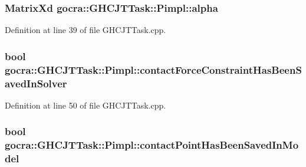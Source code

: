 \subsubsection[{\texorpdfstring{alpha}{alpha}}]{\setlength{\rightskip}{0pt plus 5cm}Matrix\+Xd gocra\+::\+G\+H\+C\+J\+T\+Task\+::\+Pimpl\+::alpha}\hypertarget{structgocra_1_1GHCJTTask_1_1Pimpl_a71d5221274d0ee84040992042d609cec}{}\label{structgocra_1_1GHCJTTask_1_1Pimpl_a71d5221274d0ee84040992042d609cec}


Definition at line 39 of file G\+H\+C\+J\+T\+Task.\+cpp.

\subsubsection[{\texorpdfstring{contact\+Force\+Constraint\+Has\+Been\+Saved\+In\+Solver}{contactForceConstraintHasBeenSavedInSolver}}]{\setlength{\rightskip}{0pt plus 5cm}bool gocra\+::\+G\+H\+C\+J\+T\+Task\+::\+Pimpl\+::contact\+Force\+Constraint\+Has\+Been\+Saved\+In\+Solver}\hypertarget{structgocra_1_1GHCJTTask_1_1Pimpl_a2cb3237a503679f5dcc201c05b00f248}{}\label{structgocra_1_1GHCJTTask_1_1Pimpl_a2cb3237a503679f5dcc201c05b00f248}


Definition at line 50 of file G\+H\+C\+J\+T\+Task.\+cpp.

\subsubsection[{\texorpdfstring{contact\+Point\+Has\+Been\+Saved\+In\+Model}{contactPointHasBeenSavedInModel}}]{\setlength{\rightskip}{0pt plus 5cm}bool gocra\+::\+G\+H\+C\+J\+T\+Task\+::\+Pimpl\+::contact\+Point\+Has\+Been\+Saved\+In\+Model}\hypertarget{structgocra_1_1GHCJTTask_1_1Pimpl_acd52e769176ed61ce95a322b1adc8c10}{}\label{structgocra_1_1GHCJTTask_1_1Pimpl_acd52e769176ed61ce95a322b1adc8c10}


